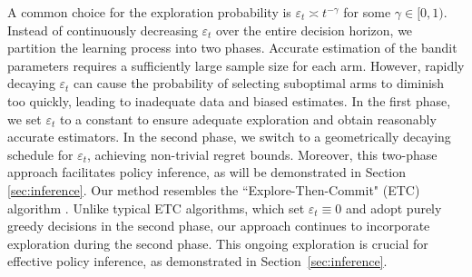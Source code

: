 \documentclass[12pt]{article}
\theoremstyle{plain}
\begin{document}
A common choice for the exploration probability is $\varepsilon_t\asymp t^{-\gamma}$ for some $\gamma\in [0,1)$. Instead of continuously decreasing $\varepsilon_t$ over the entire decision horizon, we partition the learning process into two phases. Accurate estimation of the bandit parameters requires a sufficiently large sample size for each arm. However, rapidly decaying $\varepsilon_t$ 	
can cause the probability of selecting suboptimal arms to diminish too quickly, leading to inadequate data and biased estimates. 
In the first phase, we set $\varepsilon_t$ to a constant to ensure adequate exploration and obtain reasonably accurate estimators. In the second phase, we switch to a geometrically decaying schedule for $\varepsilon_t$, achieving non-trivial regret bounds. Moreover, this two-phase approach facilitates policy inference, as will be demonstrated in Section \ref{sec:inference}. Our method resembles the ``Explore-Then-Commit" (ETC) algorithm \citep{garivier2016explore, lattimore2020bandit,perchet2016batched}. Unlike typical ETC algorithms, which set $\varepsilon_t\equiv 0$ and adopt purely greedy decisions in the second phase, our approach continues to incorporate exploration during the second phase. This ongoing exploration is crucial for effective policy inference, as demonstrated in Section~\ref{sec:inference}.


\end{document}
